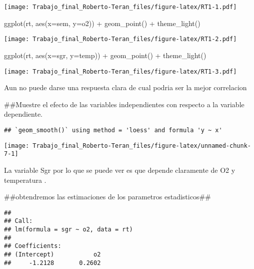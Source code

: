 \documentclass[
]{article}
\newenvironment{Shaded}{\begin{snugshade}}{\end{snugshade}}
\newcommand{\AttributeTok}[1]{\textcolor[rgb]{0.77,0.63,0.00}{#1}}
\newcommand{\FunctionTok}[1]{\textcolor[rgb]{0.00,0.00,0.00}{#1}}
\newcommand{\NormalTok}[1]{#1}
\newcommand{\SpecialCharTok}[1]{\textcolor[rgb]{0.00,0.00,0.00}{#1}}
\begin{document}
\texttt{[image: Trabajo\_final\_Roberto-Teran\_files/figure-latex/RT1-1.pdf]}

\begin{Shaded}
\begin{Highlighting}[]
\FunctionTok{ggplot}\NormalTok{(rt, }\FunctionTok{aes}\NormalTok{(}\AttributeTok{x=}\NormalTok{sem, }\AttributeTok{y=}\NormalTok{o2)) }\SpecialCharTok{+} 
  \FunctionTok{geom\_point}\NormalTok{() }\SpecialCharTok{+} \FunctionTok{theme\_light}\NormalTok{()}
\end{Highlighting}
\end{Shaded}

\texttt{[image: Trabajo\_final\_Roberto-Teran\_files/figure-latex/RT1-2.pdf]}

\begin{Shaded}
\begin{Highlighting}[]
\FunctionTok{ggplot}\NormalTok{(rt, }\FunctionTok{aes}\NormalTok{(}\AttributeTok{x=}\NormalTok{sgr, }\AttributeTok{y=}\NormalTok{temp)) }\SpecialCharTok{+} 
  \FunctionTok{geom\_point}\NormalTok{() }\SpecialCharTok{+} \FunctionTok{theme\_light}\NormalTok{()}
\end{Highlighting}
\end{Shaded}

\texttt{[image: Trabajo\_final\_Roberto-Teran\_files/figure-latex/RT1-3.pdf]}

Aun no puede darse una respuesta clara de cual podria ser la mejor
correlacion

\#\#Muestre el efecto de las variables independientes con respecto a la
variable dependiente.

\begin{verbatim}
## `geom_smooth()` using method = 'loess' and formula 'y ~ x'
\end{verbatim}

\begin{center}\texttt{[image: Trabajo\_final\_Roberto-Teran\_files/figure-latex/unnamed-chunk-7-1]} \end{center}

La variable Sgr por lo que se puede ver es que depende claramente de O2
y temperatura .

\#\#obtendremos las estimaciones de los parametros estadisticos\#\#

\begin{verbatim}
## 
## Call:
## lm(formula = sgr ~ o2, data = rt)
## 
## Coefficients:
## (Intercept)           o2  
##     -1.2128       0.2602
\end{verbatim}
\end{document}
